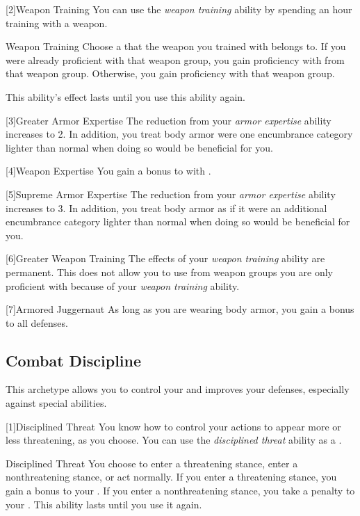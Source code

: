         [2]{Weapon Training} You can use the \textit{weapon training} ability by spending an hour training with a weapon.
        \begin{freeability}{Weapon Training}
            Choose a  that the weapon you trained with belongs to.
            If you were already proficient with that weapon group, you gain proficiency with  from that weapon group.
            Otherwise, you gain proficiency with that weapon group.

            This ability's effect lasts until you use this ability again.
        \end{freeability}

        [3]{Greater Armor Expertise}
        The  reduction from your \textit{armor expertise} ability increases to 2.
        In addition, you treat body armor were one encumbrance category lighter than normal when doing so would be beneficial for you.

        [4]{Weapon Expertise} You gain a  bonus to  with .

        [5]{Supreme Armor Expertise}
        The  reduction from your \textit{armor expertise} ability increases to 3.
        In addition, you treat body armor as if it were an additional encumbrance category lighter than normal when doing so would be beneficial for you.

        [6]{Greater Weapon Training} The effects of your \textit{weapon training} ability are permanent.
        This does not allow you to use  from weapon groups you are only proficient with because of your \textit{weapon training} ability.

        [7]{Armored Juggernaut}
        As long as you are wearing body armor, you gain a  bonus to all defenses.

    \subsection{Combat Discipline}
        This archetype allows you to control your  and improves your defenses, especially against special abilities.

        [1]{Disciplined Threat}
        You know how to control your actions to appear more or less threatening, as you choose.
        You can use the \textit{disciplined threat} ability as a .
        \begin{freeability}{Disciplined Threat}
            You choose to enter a threatening stance, enter a nonthreatening stance, or act normally.
            If you enter a threatening stance, you gain a  bonus to your .
            If you enter a nonthreatening stance, you take a  penalty to your .
            This ability lasts until you use it again.
        \end{freeability}

